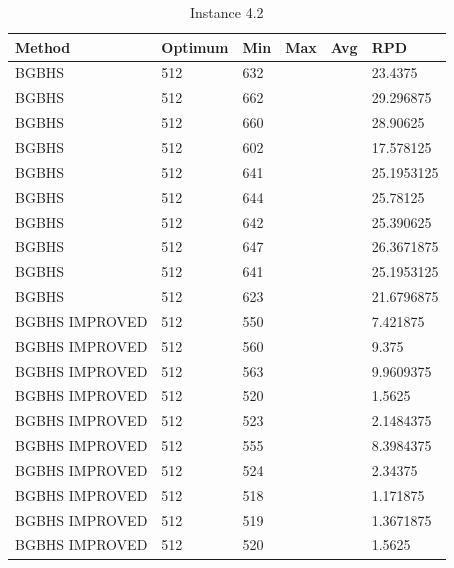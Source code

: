 \begin{table}[H]
\centering
\begin{tabular}{ | l | l | l | l | l | l | }
\hline
	Method & Optimum & Min & Max & Avg & RPD \\ \hline
	BGBHS & 512 & 632 &  &  & 23.4375 \\ \hline
	BGBHS & 512 & 662 &  &  & 29.296875 \\ \hline
	BGBHS & 512 & 660 &  &  & 28.90625 \\ \hline
	BGBHS & 512 & 602 &  &  & 17.578125 \\ \hline
	BGBHS & 512 & 641 &  &  & 25.1953125 \\ \hline
	BGBHS & 512 & 644 &  &  & 25.78125 \\ \hline
	BGBHS & 512 & 642 &  &  & 25.390625 \\ \hline
	BGBHS & 512 & 647 &  &  & 26.3671875 \\ \hline
	BGBHS & 512 & 641 &  &  & 25.1953125 \\ \hline
	BGBHS & 512 & 623 &  &  & 21.6796875 \\ \hline
	BGBHS IMPROVED & 512 & 550 &  &  & 7.421875 \\ \hline
	BGBHS IMPROVED & 512 & 560 &  &  & 9.375 \\ \hline
	BGBHS IMPROVED & 512 & 563 &  &  & 9.9609375 \\ \hline
	BGBHS IMPROVED & 512 & 520 &  &  & 1.5625 \\ \hline
	BGBHS IMPROVED & 512 & 523 &  &  & 2.1484375 \\ \hline
	BGBHS IMPROVED & 512 & 555 &  &  & 8.3984375 \\ \hline
	BGBHS IMPROVED & 512 & 524 &  &  & 2.34375 \\ \hline
	BGBHS IMPROVED & 512 & 518 &  &  & 1.171875 \\ \hline
	BGBHS IMPROVED & 512 & 519 &  &  & 1.3671875 \\ \hline
	BGBHS IMPROVED & 512 & 520 &  &  & 1.5625 \\ \hline
\end{tabular}
\caption{Instance 4.2}
\label{tblscp42}
\end{table}

\newpage
